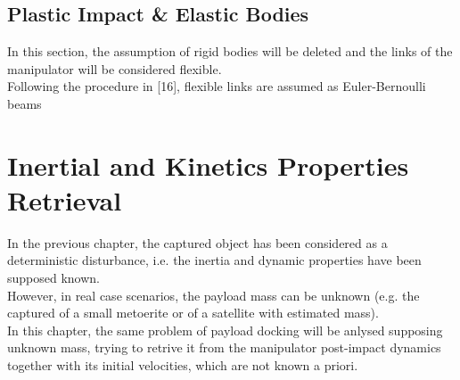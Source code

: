 \documentclass[a4paper,12pt,oneside]{report}
\begin{document}
\section{Plastic Impact \& Elastic Bodies}
In this section, the assumption of rigid bodies will be deleted and the links of the manipulator will be considered flexible.\\
Following the procedure in [16], flexible links are assumed as Euler-Bernoulli beams
\chapter{Inertial and Kinetics Properties Retrieval}
In the previous chapter, the captured object has been considered as a deterministic disturbance, i.e. the inertia and dynamic properties have been supposed known.\\
However, in real case scenarios, the payload mass can be unknown (e.g. the captured of a small metoerite or of a satellite with estimated mass).\\
In this chapter, the same problem of payload docking will be anlysed supposing unknown mass, trying to retrive it from the manipulator post-impact dynamics together with its initial velocities, which are not known a priori.
\end{document}
